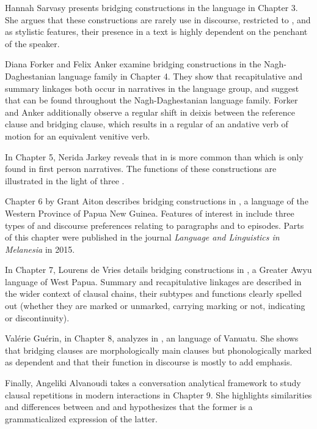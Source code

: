 \begin{refsection}
Hannah Sarvasy presents bridging constructions in the  language  in Chapter 3. She argues that these constructions are rarely use in  discourse, restricted to , and as stylistic features, their presence in a text is highly dependent on the penchant of the speaker. 

Diana Forker and Felix Anker examine bridging constructions in the Nagh-Daghestanian language family in Chapter 4. They show that recapitulative and summary linkages both occur in narratives in the  language group, and suggest that  can be found throughout the Nagh-Daghestanian language family. Forker and Anker additionally observe a regular shift in deixis between the reference clause and bridging clause, which results in a regular  of an andative verb of motion for an equivalent venitive verb. 

In Chapter 5, Nerida Jarkey reveals that in   is more common than  which is only found in first person narratives. The functions of these constructions are illustrated in the light of three . 

Chapter 6 by Grant Aiton describes bridging constructions in , a language of the Western Province of Papua New Guinea. Features of interest in  include three types of  and discourse preferences relating  to paragraphs and  to episodes. Parts of this chapter were published in the journal \textit{Language and Linguistics in Melanesia} in 2015. 

In Chapter 7, Lourens de Vries details bridging constructions in , a Greater Awyu language of West Papua. Summary and recapitulative linkages are described in the wider context of clausal chains, their subtypes and functions clearly spelled out (whether they are marked or unmarked, carrying  marking or not, indicating  or discontinuity). 

Valérie Guérin, in Chapter 8, analyzes  in , an  language of Vanuatu. She shows that bridging clauses are morphologically main clauses but phonologically marked as dependent and that their function in discourse is mostly to add emphasis. 

Finally, Angeliki Alvanoudi takes a conversation analytical framework to study clausal repetitions in modern  interactions in Chapter 9. She highlights similarities and differences between  and  and hypothesizes that the former is a grammaticalized expression of the latter. 




\end{refsection}
